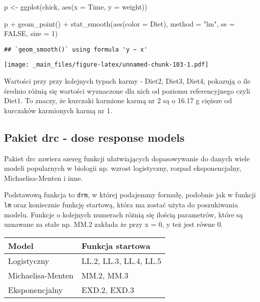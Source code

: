 \documentclass[
]{book}
\newenvironment{Shaded}{\begin{snugshade}}{\end{snugshade}}
\newcommand{\AttributeTok}[1]{\textcolor[rgb]{0.77,0.63,0.00}{#1}}
\newcommand{\ConstantTok}[1]{\textcolor[rgb]{0.00,0.00,0.00}{#1}}
\newcommand{\DecValTok}[1]{\textcolor[rgb]{0.00,0.00,0.81}{#1}}
\newcommand{\FunctionTok}[1]{\textcolor[rgb]{0.00,0.00,0.00}{#1}}
\newcommand{\NormalTok}[1]{#1}
\newcommand{\OtherTok}[1]{\textcolor[rgb]{0.56,0.35,0.01}{#1}}
\newcommand{\SpecialCharTok}[1]{\textcolor[rgb]{0.00,0.00,0.00}{#1}}
\newcommand{\StringTok}[1]{\textcolor[rgb]{0.31,0.60,0.02}{#1}}
\begin{document}
\begin{Shaded}
\begin{Highlighting}[]
\NormalTok{p }\OtherTok{\textless{}{-}} \FunctionTok{ggplot}\NormalTok{(chick, }\FunctionTok{aes}\NormalTok{(}\AttributeTok{x =}\NormalTok{ Time, }\AttributeTok{y =}\NormalTok{ weight))}

\NormalTok{p }\SpecialCharTok{+} \FunctionTok{geom\_point}\NormalTok{() }\SpecialCharTok{+} \FunctionTok{stat\_smooth}\NormalTok{(}\FunctionTok{aes}\NormalTok{(}\AttributeTok{color =}\NormalTok{ Diet), }\AttributeTok{method =} \StringTok{"lm"}\NormalTok{, }\AttributeTok{se =} \ConstantTok{FALSE}\NormalTok{, }\AttributeTok{size =} \DecValTok{1}\NormalTok{)}
\end{Highlighting}
\end{Shaded}

\begin{verbatim}
## `geom_smooth()` using formula 'y ~ x'
\end{verbatim}

\texttt{[image: \_main\_files/figure-latex/unnamed-chunk-103-1.pdf]}

Wartości przy przy kolejnych typach karmy - Diet2, Diet3, Diet4, pokazują o ile średnio różnią się wartości wyznaczone dla nich od poziomu referencyjnego czyli Diet1. To znaczy, że kurczaki karmione karmą nr 2 są o 16.17 g cięższe od kurczaków karmionych karmą nr 1.

\hypertarget{pakiet-drc---dose-response-models}{%
\subsection{Pakiet drc - dose response models}\label{pakiet-drc---dose-response-models}}

Pakiet drc zawiera szereg funkcji ułatwiających dopasowywanie do danych wiele modeli popularnych w biologii np. wzrost logistyczny, rozpad eksponencjalny, Michaelisa-Menten i inne.

Podstawową funkcja to \texttt{drm}, w której podajemmy formułę, podobnie jak w funkcji \texttt{lm} oraz koniecznie funkcję startową, która ma zostać użyta do poszukiwania modelu. Funkcje o kolejnych numerach różnią się ilością parametrów, które są uznawane za stałe np. MM.2 zakłada że przy x = 0, y też jest równe 0.

\begin{longtable}[]{@{}ll@{}}
\toprule
Model & Funkcja startowa \\
\midrule
\endhead
Logistyczny & LL.2, LL.3, LL.4, LL.5 \\
Michaelisa-Menten & MM.2, MM.3 \\
Eksponencjalny & EXD.2, EXD.3 \\
\bottomrule
\end{longtable}
\end{document}
